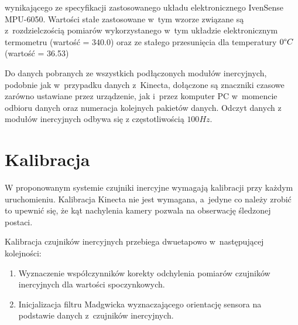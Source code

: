 wynikającego ze specyfikacji zastosowanego układu elektronicznego IvenSense MPU-6050. Wartości stałe zastosowane w~tym wzorze związane są z~rozdzielczością pomiarów wykorzystanego w~tym układzie elektronicznym termometru (wartość = 340.0) oraz ze stałego przesunięcia dla temperatury $0 \degree C$ (wartość = 36.53)
				
Do danych pobranych ze wszystkich podłączonych modułów inercyjnych, podobnie jak w~przypadku danych z~Kinecta, dołączone są znaczniki czasowe zarówno ustawiane przez urządzenie, jak i~przez komputer PC w~momencie odbioru danych oraz numeracja kolejnych pakietów danych. Odczyt danych z modułów inercyjnych odbywa się z częstotliwością $100Hz$.
		
\section{Kalibracja}
W proponowanym systemie czujniki inercyjne wymagają kalibracji przy każdym uruchomieniu. Kalibracja Kinecta nie jest wymagana, a~jedyne co należy zrobić to upewnić się, że kąt nachylenia kamery pozwala na obserwację śledzonej postaci.
		
Kalibracja czujników inercyjnych przebiega dwuetapowo w~następującej kolejności:
\begin{enumerate}
	\item {Wyznaczenie współczynników korekty odchylenia pomiarów czujników inercyjnych dla wartości spoczynkowych.} 
	\item {Inicjalizacja filtru Madgwicka wyznaczającego orientację sensora na podstawie danych z~czujników inercyjnych.}
\end{enumerate}
		
